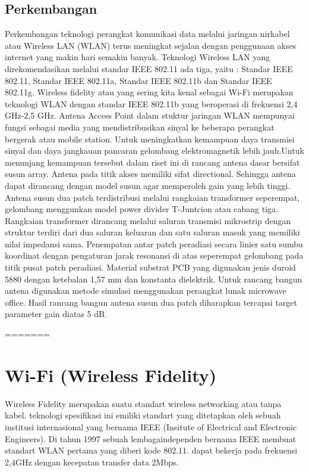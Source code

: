 \subsection {Perkembangan}
Perkembangan teknologi perangkat komunikasi data melalui jaringan nirkabel atau Wireless LAN (WLAN) terus meningkat sejalan dengan 
penggunaan akses internet yang makin hari semakin banyak. Teknologi Wireless LAN yang direkomendasikan melalui standar IEEE 802.11 
ada tiga, yaitu : Standar IEEE 802.11, Standar IEEE 802.11a, 
Standar IEEE 802.11b dan Standar IEEE 802.11g. Wireless fidelity atau yang sering 
kita kenal sebagai Wi-Fi merupakan teknologi WLAN dengan standar IEEE 802.11b yang beroperasi di frekuensi 2,4 GHz-2,5 GHz. Antena Access 
Point dalam stuktur jaringan WLAN mempunyai fungsi sebagai media yang mendistribusikan sinyal ke beberapa perangkat bergerak atau mobile 
station. Untuk meningkatkan kemampuan daya transmisi sinyal dan daya jangkauan pancaran gelombang elektromagnetik lebih jauh.Untuk 
menunjang kemampuan tersebut dalam riset ini di rancang antena dasar bersifat susun array. Antena pada titik akses memiliki sifat 
directional. Sehingga antena dapat dirancang dengan model susun agar memperoleh gain yang lebih tinggi. Antena susun dua patch 
terdistribusi melalui rangkaian transformer seperempat, gelombang menggunkan model power divider T-Juntcion atau cabang tiga. Rangkaian transformer 
dirancang melalui saluran transmisi mikrostrip dengan struktur terdiri dari dua saluran keluaran dan satu saluran masuk yang memiliki 
nilai impedansi sama. Penempatan antar patch peradiasi secara linier satu sumbu koordinat dengan pengaturan jarak resonansi di atas 
seperempat gelombang pada titik pusat patch peradiasi. Material substrat PCB yang digunakan jenis duroid 5880 dengan ketebalan 1,57 mm dan
konstanta dielektrik. Untuk rancang bangun antena digunakan metode simulasi menggunakan perangkat lunak microwave office. Hasil rancang bangun antena susun dua patch diharapkan tercapai target parameter gain diatas 5 dB.
 
 \cite {yustiyan2006analisa}
 \cite {arief2007teknologi}
 \cite {darsono2012rancang}
=======

\section {Wi-Fi (Wireless Fidelity)}
Wireless Fidelity merupakan suatu standart wireless networking atau tanpa kabel. teknologi spesifikasi ini emiliki standart yang 
ditetapkan oleh sebuah institusi internasional yang bernama IEEE  (Insitute of Electrical and Electronic Engineers). Di tahun 1997 
sebuah lembagaindependen bernama IEEE membuat standart WLAN pertama yang diberi kode 802.11. dapat bekerja pada frekuensi 2,4GHz 
dengan kecepatan transfer data 2Mbps.


